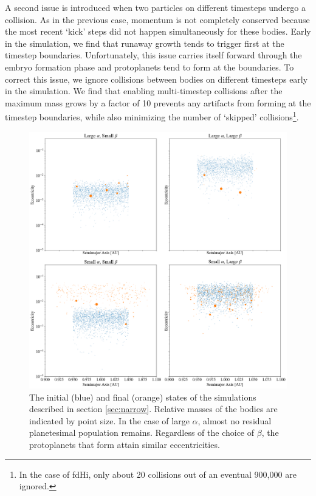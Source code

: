 \documentclass[twocolumn]{aastex63}
\begin{document}
A second issue is introduced when two particles on different timesteps undergo a collision. As in the previous case, momentum is not completely conserved because the most recent `kick' steps did not happen simultaneously for these bodies. Early in the simulation, we find that runaway growth tends to trigger first at the timestep boundaries. Unfortunately, this issue carries itself forward through the embryo formation phase and protoplanets tend to form at the boundaries. To correct this issue, we ignore collisions between bodies on different timesteps early in the simulation. We find that enabling multi-timestep collisions after the maximum mass grows by a factor of 10 prevents any artifacts from forming at the timestep boundaries, while also minimizing the number of `skipped' collisions\footnote{In the case of fdHi, only about 20 collisions out of an eventual 900,000 are ignored.}.  

\begin{figure}
\begin{center}
    \includegraphics[width=\textwidth]{figures/alpha_beta.png}
    \caption{The initial (blue) and final (orange) states of the simulations described in section \ref{sec:narrow}. Relative masses of the bodies are indicated by point size. In the case of large $\alpha$, almost no residual planetesimal population remains. Regardless of the choice of $\beta$, the protoplanets that form attain similar eccentricities. \label{fig:alpha_beta}}
\end{center}
\end{figure}
\end{document}
